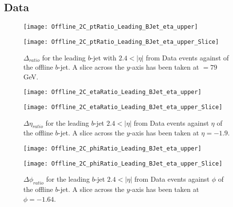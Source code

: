 		\newpage
		\subsection{Data}
		
		\begin{figure}[h]
			\centering
			\begin{minipage}[h]{0.33\linewidth}
				\texttt{[image: Offline\_2C\_ptRatio\_Leading\_BJet\_eta\_upper]}
				
			\end{minipage}
			\quad
			\begin{minipage}[h]{0.33\linewidth}
				\texttt{[image: Offline\_2C\_ptRatio\_Leading\_BJet\_eta\_upper\_Slice]}
			\end{minipage}
			\caption{$\Delta $\pt$_{ratio}$ for the leading \pt $b$-jet with $2.4 < |\eta|$ from Data events against \pt of the offline $b$-jet. A slice across the $y$-axis has been taken at \pt$=79$GeV. }
			\label{fig:D:leadingbptforward}
		\end{figure}
		
		\begin{figure}[h]
			\centering
			
			\begin{minipage}[h]{0.33\linewidth}
				\texttt{[image: Offline\_2C\_etaRatio\_Leading\_BJet\_eta\_upper]}
			\end{minipage}
			\quad
			\begin{minipage}[h]{0.33\linewidth}
				\texttt{[image: Offline\_2C\_etaRatio\_Leading\_BJet\_eta\_upper\_Slice]}
			\end{minipage}
			\caption{$\Delta \eta_{ratio}$ for the leading \pt $b$-jet $2.4 < |\eta|$ from Data events against $\eta$ of the offline $b$-jet. A slice across the $y$-axis has been taken at $\eta=-1.9$. }
			\label{fig:D:leadingbetaforward}
		\end{figure}
		
		\begin{figure}[h]
			\centering
			
			\begin{minipage}[h]{0.33\linewidth}
				\texttt{[image: Offline\_2C\_phiRatio\_Leading\_BJet\_eta\_upper]}
			\end{minipage}
			\quad
			\begin{minipage}[h]{0.33\linewidth}
				\texttt{[image: Offline\_2C\_phiRatio\_Leading\_BJet\_eta\_upper\_Slice]}
			\end{minipage}
			\caption{$\Delta \phi_{ratio}$ for the leading \pt $b$-jet $2.4 < |\eta|$ from Data events against $\phi$ of the offline $b$-jet. A slice across the $y$-axis has been taken at $\phi=-1.64$. }
			\label{fig:D:leadingbphiforward}
		\end{figure}
		
